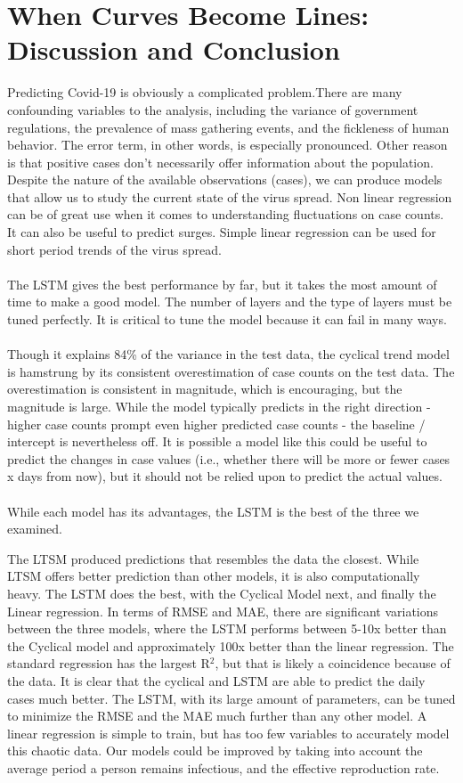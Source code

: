 \documentclass{article}
\begin{document}
\section{When Curves Become Lines: Discussion and Conclusion}
Predicting Covid-19 is obviously a complicated problem.There are many confounding variables to the analysis, including the variance of government regulations, the prevalence of mass gathering events, and the fickleness of human behavior. The error term, in other words, is especially pronounced. Other reason is that positive cases don't necessarily offer information about the population. Despite the nature of the available observations (cases), we can produce models that allow us to study the current state of the virus spread. Non linear regression can be of great use when it comes to understanding fluctuations on case counts. It can also be useful to predict surges. Simple linear regression can be used for short period trends of the virus spread.  \\\\
The LSTM gives the best performance by far, but it takes the most amount of time to make a good model. The number of layers and the type of layers must be tuned perfectly. It is critical to tune the model because it can fail in many ways.\\\\
Though it explains 84\% of the variance in the test data, the cyclical trend model is hamstrung by its consistent overestimation of case counts on the test data. The overestimation is consistent in magnitude, which is encouraging, but the magnitude is large. While the model typically predicts in the right direction - higher case counts prompt even higher predicted case counts - the baseline / intercept is nevertheless off. It is possible a model like this could be useful to predict the changes in case values (i.e., whether there will be more or fewer cases x days from now), but it should not be relied upon to predict the actual values.\\\\
While each model has its advantages, the LSTM is the best of the three we examined. 

The LTSM produced predictions that resembles the data the closest. While LTSM offers better prediction than other models, it is also computationally heavy. The LSTM does the best, with the Cyclical Model next, and finally the Linear regression. In terms of RMSE and MAE, there are significant variations between the three models, where the LSTM performs between 5-10x better than the Cyclical model and approximately 100x better than the linear regression. The standard regression has the largest R$^2$, but that is likely a coincidence because of the data. It is clear that the cyclical and LSTM are able to predict the daily cases much better. The LSTM, with its large amount of parameters, can be tuned to minimize the RMSE and the MAE much further than any other model. A linear regression is simple to train, but has too few variables to accurately model this chaotic data. Our models could be improved by taking into account the average period a person remains infectious, and the effective reproduction rate. 
\end{document}
